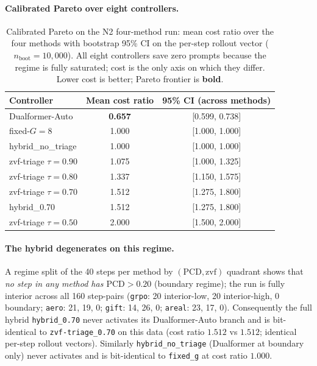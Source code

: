 \documentclass{article}
\begin{document}
\paragraph{Calibrated Pareto over eight controllers.}

\begin{table}[t]
\centering
\caption{Calibrated Pareto on the N2 four-method run: mean cost ratio
over the four methods with bootstrap 95\% CI on the per-step rollout
vector ($n_{\text{boot}}{=}10{,}000$). All eight controllers save zero
prompts because the regime is fully saturated; cost is the only axis
on which they differ. Lower cost is better; Pareto frontier is
\textbf{bold}.}
\label{tab:p7-pareto}
\begin{tabular}{lcc}
\toprule
Controller & Mean cost ratio & 95\% CI (across methods) \\
\midrule
Dualformer-Auto              & \textbf{0.657} & [0.599, 0.738] \\
fixed-$G{=}8$                & 1.000          & [1.000, 1.000] \\
hybrid\_no\_triage            & 1.000          & [1.000, 1.000] \\
zvf-triage $\tau{=}0.90$      & 1.075          & [1.000, 1.325] \\
zvf-triage $\tau{=}0.80$      & 1.337          & [1.150, 1.575] \\
zvf-triage $\tau{=}0.70$      & 1.512          & [1.275, 1.800] \\
hybrid\_0.70                  & 1.512          & [1.275, 1.800] \\
zvf-triage $\tau{=}0.50$      & 2.000          & [1.500, 2.000] \\
\bottomrule
\end{tabular}
\end{table}

\paragraph{The hybrid degenerates on this regime.}
A regime split of the 40 steps per method by
$(\mathrm{PCD}, \mathrm{zvf})$ quadrant shows that \emph{no step in
any method has $\mathrm{PCD} > 0.20$} (boundary regime); the run is
fully interior across all 160 step-pairs
(\texttt{grpo}: 20 interior-low, 20 interior-high, 0 boundary;
\texttt{aero}: 21, 19, 0; \texttt{gift}: 14, 26, 0;
\texttt{areal}: 23, 17, 0). Consequently the full hybrid
\texttt{hybrid\_0.70} never activates its Dualformer-Auto branch
and is bit-identical to \texttt{zvf-triage\_0.70} on this data
(cost ratio $1.512$ vs $1.512$; identical per-step rollout vectors).
Similarly \texttt{hybrid\_no\_triage} (Dualformer at boundary only)
never activates and is bit-identical to \texttt{fixed\_g} at
cost ratio $1.000$.
\end{document}
